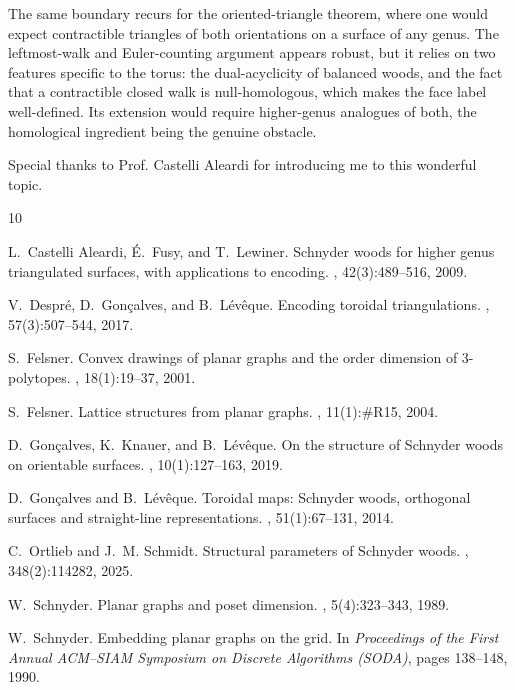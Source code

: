 \documentclass[11pt]{amsart}
\theoremstyle{plain}
\theoremstyle{definition}
\theoremstyle{remark}
\begin{document}
The same boundary recurs for the oriented-triangle theorem, where one would expect contractible triangles of both orientations on a surface of any genus. The leftmost-walk and Euler-counting argument appears robust, but it relies on two features specific to the torus: the dual-acyclicity of balanced woods, and the fact that a contractible closed walk is null-homologous, which makes the face label well-defined. Its extension would require higher-genus analogues of both, the homological ingredient being the genuine obstacle.

Special thanks to Prof. Castelli Aleardi for introducing me to this wonderful topic.
\endgroup

\newpage
\begin{thebibliography}{10}

L.~Castelli Aleardi, \'E.~Fusy, and T.~Lewiner.
\newblock Schnyder woods for higher genus triangulated surfaces, with
  applications to encoding.
, 42(3):489--516, 2009.

V.~Despr\'e, D.~Gon\c{c}alves, and B.~L\'ev\^eque.
\newblock Encoding toroidal triangulations.
, 57(3):507--544, 2017.

S.~Felsner.
\newblock Convex drawings of planar graphs and the order dimension of
  $3$-polytopes.
, 18(1):19--37, 2001.

S.~Felsner.
\newblock Lattice structures from planar graphs.
, 11(1):\#R15, 2004.

D.~Gon\c{c}alves, K.~Knauer, and B.~L\'ev\^eque.
\newblock On the structure of Schnyder woods on orientable surfaces.
, 10(1):127--163, 2019.

D.~Gon\c{c}alves and B.~L\'ev\^eque.
\newblock Toroidal maps: Schnyder woods, orthogonal surfaces and straight-line
  representations.
, 51(1):67--131, 2014.

C.~Ortlieb and J.~M. Schmidt.
\newblock Structural parameters of Schnyder woods.
, 348(2):114282, 2025.

W.~Schnyder.
\newblock Planar graphs and poset dimension.
, 5(4):323--343, 1989.

W.~Schnyder.
\newblock Embedding planar graphs on the grid.
\newblock In {\em Proceedings of the First Annual ACM--SIAM Symposium on
  Discrete Algorithms (SODA)}, pages 138--148, 1990.

\end{thebibliography}
\end{document}
